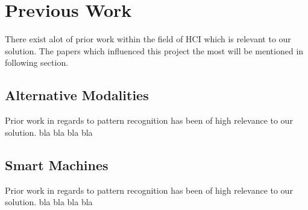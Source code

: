 \section{Previous Work}
There exist alot of prior work within the field of HCI which is relevant to our solution.
The papers which influenced this project the most will be mentioned in following section.

\subsection{Alternative Modalities}
Prior work in regards to pattern recognition has been of high relevance to our solution.
bla bla bla bla

\subsection{Smart Machines}
Prior work in regards to pattern recognition has been of high relevance to our solution.
bla bla bla bla

